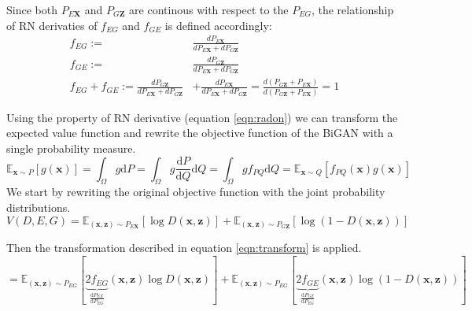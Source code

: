 Since both $P_{E\mathbf{X}}$ and $P_{G\mathbf{Z}}$ are continous with respect to the $P_{EG}$, the
relationship of RN derivaties of $f_{EG}$ and $f_{GE}$ is defined accordingly:
\begin{align}
  f_{EG} :=& \frac{ d P_{E\mathbf{X}} }{ d P_{E\mathbf{X}} + d P_{G\mathbf{Z}}} \\[5pt]
  f_{GE} :=& \frac{ d P_{G\mathbf{Z}} }{ d P_{E\mathbf{X}} + d P_{G\mathbf{Z}}} \\[5pt]
  f_{EG} + f_{GE} :=   \frac{ d P_{G\mathbf{Z}} }{ d P_{E\mathbf{X}} + d P_{G\mathbf{Z}}} &+ \frac{ d P_{E\mathbf{X}} }{ d P_{E\mathbf{X}} + d P_{G\mathbf{Z}}} = \frac{ d( P_{G\mathbf{Z}} + P_{E\mathbf{X}}) }{ d( P_{G\mathbf{Z}} + P_{E\mathbf{X}} ) } = 1 
\end{align}

Using the property of RN derivative (equation \ref{eqn:radon}) we can transform the expected value
function and rewrite the objective function of the BiGAN with a single probability
measure.\cite{Donahue2017AdversarialFL} \cite{Goodfellow:2014:GAN:2969033.2969125}
\begin{equation}
    \label{eqn:transform}
    \mathbb{E}_{\mathbf{x} \sim P}[g(\mathbf{x})]=\int_{\Omega} g \mathrm{d} P=\int_{\Omega} g \frac{\mathrm{d} P}{\mathrm{d} Q} \mathrm{d} Q=\int_{\Omega} g f_{P Q} \mathrm{d} Q=\mathbb{E}_{\mathbf{x} \sim Q}\left[f_{P Q}(\mathbf{x}) g(\mathbf{x})\right]
\end{equation}
We start by rewriting the original objective function with the joint probability distributions.
\begin{equation}
    V(D, E, G) = \mathbb{E}_{(\mathbf{x}, \mathbf{z}) \sim P_{E \mathbf{X}}}[\log D(\mathbf{x}, \mathbf{z})]+\mathbb{E}_{(\mathbf{x}, \mathbf{z}) \sim P_{G \mathbf{Z}}}[\log (1-D(\mathbf{x}, \mathbf{z}))] 
\end{equation}

Then the transformation described in equation \ref{eqn:transform} is applied.
\begin{equation}
    =\mathbb{E}_{(\mathbf{x}, \mathbf{z}) \sim P_{E G}}  [ \underbrace{2 f_{E G}}_{\frac{\mathrm{d} P_{E X}}{\mathrm{d} P_{E G}}}(\mathbf{x}, \mathbf{z}) \log D(\mathbf{x}, \mathbf{z})] +\mathbb{E}_{(\mathbf{x}, \mathbf{z}) \sim P_{E G}}[\underbrace{2 f_{G E}}_{\frac{\mathrm{d} P_{G Z}}{\mathrm{d} P_{E G}}}(\mathbf{x}, \mathbf{z}) \log (1-D(\mathbf{x}, \mathbf{z}))]
\end{equation}

